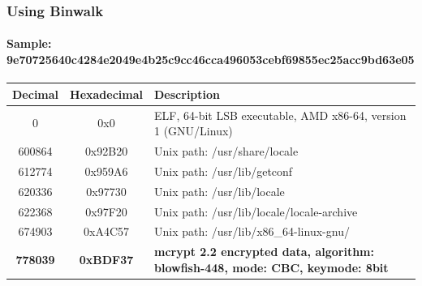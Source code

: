 \begin{frame}[fragile]
\frametitle{Using Binwalk}
\framesubtitle{Sample: 9e70725640c4284e2049e4b25c9cc46cca496053cebf69855ec25acc9bd63e05}
\begin{tabular}{|c|c|p{}|}
\hline
\textbf{Decimal} & \textbf{Hexadecimal} & \textbf{Description} \\ \hline
0                & 0x0                  & ELF, 64-bit LSB executable, AMD x86-64, version 1 (GNU/Linux) \\ \hline
600864           & 0x92B20              & Unix path: /usr/share/locale \\ \hline
612774           & 0x959A6              & Unix path: /usr/lib/getconf \\ \hline
620336           & 0x97730              & Unix path: /usr/lib/locale \\ \hline
622368           & 0x97F20              & Unix path: /usr/lib/locale/locale-archive \\ \hline
674903           & 0xA4C57              & Unix path: /usr/lib/x86\_64-linux-gnu/ \\ \hline

\textbf{778039}           & \textbf{0xBDF37}              & \textbf{mcrypt 2.2 encrypted data, algorithm: blowfish-448, mode: CBC, keymode: 8bit} \\ \hline
\end{tabular}

\end{frame}

